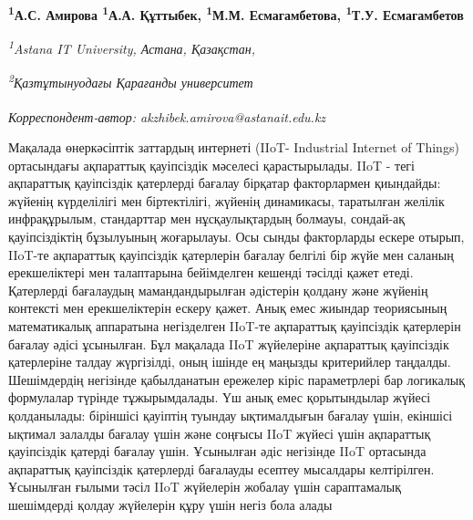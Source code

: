
\begin{articleheader}

{\bfseries
\textsuperscript{1}А.С. Амирова\textsuperscript{\envelope } \authorid
\textsuperscript{1}А.А. Құттыбек\authorid,
\textsuperscript{1}М.М. Есмагамбетова\authorid,
\textsuperscript{1}Т.У. Есмагамбетов\authorid}
\end{articleheader}

\begin{affiliation}
\emph{\textsuperscript{1}Astana IT University, Астана, Қазақстан,}

\emph{\textsuperscript{2}Қазтұтынуодағы Қарағанды университет}

\raggedright \textsuperscript{\envelope }{\em Корреспондент-автор: akzhibek.amirova@astanait.edu.kz}
\end{affiliation}

Мақалада өнеркәсіптік заттардың интернеті (IIoT- Industrial Internet of
Things) ортасындағы ақпараттық қауіпсіздік мәселесі қарастырылады. IIoT
- тегі ақпараттық қауіпсіздік қатерлерді бағалау бірқатар факторлармен
қиындайды: жүйенің күрделілігі мен біртектілігі, жүйенің динамикасы,
таратылған желілік инфрақұрылым, стандарттар мен нұсқаулықтардың
болмауы, сондай-ақ қауіпсіздіктің бұзылуының жоғарылауы. Осы сынды
факторларды ескере отырып, IIoT-те ақпараттық қауіпсіздік қатерлерін
бағалау белгілі бір жүйе мен саланың ерекшеліктері мен талаптарына
бейімделген кешенді тәсілді қажет етеді. Қатерлерді бағалаудың
мамандандырылған әдістерін қолдану және жүйенің контексті мен
ерекшеліктерін ескеру қажет. Анық емес жиындар теориясының математикалық
аппаратына негізделген IIoT-те ақпараттық қауіпсіздік қатерлерін бағалау
әдісі ұсынылған. Бұл мақалада IIoT жүйелеріне ақпараттық қауіпсіздік
қатерлеріне талдау жүргізілді, оның ішінде ең маңызды критерийлер
таңдалды. Шешімдердің негізінде қабылданатын ережелер кіріс параметрлері
бар логикалық формулалар түрінде тұжырымдалады. Үш анық емес
қорытындылар жүйесі қолданылады: біріншісі қауіптің туындау ықтималдығын
бағалау үшін, екіншісі ықтимал залалды бағалау үшін және соңғысы IIoT
жүйесі үшін ақпараттық қауіпсіздік қатерді бағалау үшін. Ұсынылған әдіс
негізінде IIoT ортасында ақпараттық қауіпсіздік қатерлерді бағалауды
есептеу мысалдары келтірілген. Ұсынылған ғылыми тәсіл IIoT жүйелерін
жобалау үшін сараптамалық шешімдерді қолдау жүйелерін құру үшін негіз
бола алады

